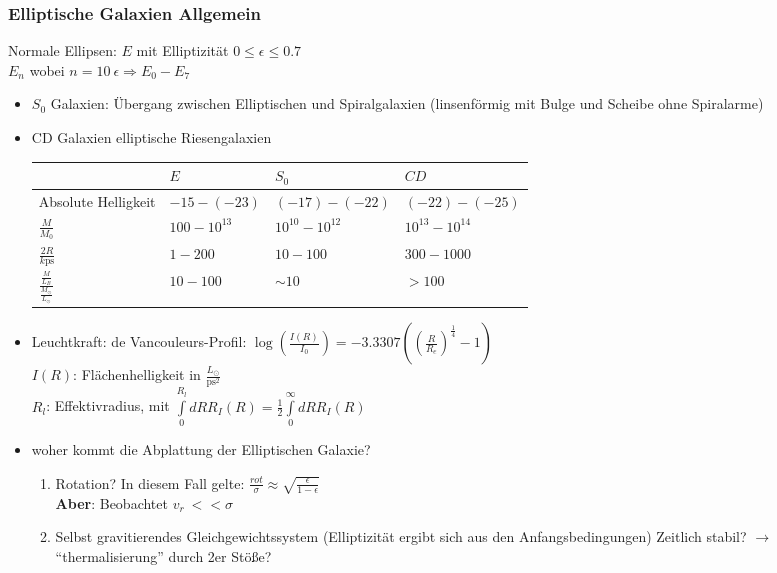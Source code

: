 \subsubsection{Elliptische Galaxien Allgemein}
Normale Ellipsen: $E$ mit Elliptizität $0\leq\epsilon\leq\num{0.7}$\\
$E_n$ wobei $n=\SI{10}{\epsilon}\Rightarrow E_0-E_7$
\begin{itemize}
	\item $S_0$ Galaxien: Übergang zwischen Elliptischen und Spiralgalaxien (linsenförmig mit Bulge und Scheibe ohne Spiralarme)
	\item CD Galaxien elliptische Riesengalaxien
		\begin{table}[H]
			\begin{tabular}{p{3cm}|p{3cm}|p{3cm}|p{3cm}}
				& $E$ & $S_0$ & $CD$ \\\hline
				Absolute Helligkeit & $-\num{15}-(-\num{23})$ & $(-\num{17})-(-\num{22})$ & $(-\num{22})-(-\num{25})$ \\\hline
				$\frac{M}{M_0}$ & $\num{100}-10^{13}$ & $10^{10}-10^{12}$ & $10^{13}-10^{14}$ \\\hline
				$\frac{2R}{\si{k\ps}}$ & $\num{1}-\num{200}$ & $\num{10}-\num{100}$ & $\num{300}-\num{1000}$ \\\hline
				$\frac{\frac{M}{L_B}}{\frac{M_\odot}{L_\odot}}$ & $\num{10}-\num{100}$ & $\sim\num{10}$ & $>\num{100}$
			\end{tabular}
		\end{table}
	\item Leuchtkraft: de Vancouleurs-Profil: $\log\left(\frac{I(R)}{I_0}\right)=-\num{3.3307}\left(\left(\frac{R}{R_e}\right)^\frac{1}{4}-1\right)$\\
		$I(R)$: Flächenhelligkeit in $\frac{L_\odot}{\si{\ps^2}}$\\
		$R_l$: Effektivradius, mit $\int\limits_0^{R_l}dRR_I(R)=\frac{1}{2}\int\limits_0^\infty dR R_I(R)$
	\item woher kommt die Abplattung der Elliptischen Galaxie?
		\begin{enumerate}[label={$\roman*)$}]
			\item Rotation? In diesem Fall gelte: $\frac{rot}{\sigma}\approx\sqrt{\frac{\epsilon}{1-\epsilon}}$\\
				\textbf{Aber}: Beobachtet $v_r\ <<\sigma$
			\item Selbst gravitierendes Gleichgewichtssystem (Elliptizität ergibt sich aus den Anfangsbedingungen) Zeitlich stabil? $\to$ "`thermalisierung"' durch 2er Stöße?
		\end{enumerate}

\end{itemize}
